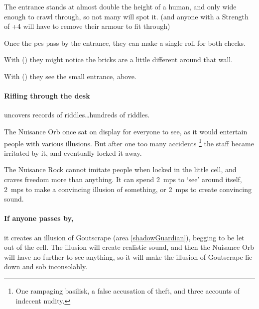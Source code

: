 The entrance stands at almost double the height of a human, and only wide enough to crawl through, so not many will spot it.
(and anyone with a Strength of +4 will have to remove their armour to fit through)

Once the \glspl{pc} pass by the entrance, they can make a single roll for both checks.

With  (\tn[14]) they might notice the bricks are a little different around that wall.

With  (\tn[12]) they see the small entrance, above.

\paragraph{Rifling through the desk}
uncovers records of riddles\ldots hundreds of riddles.


\begin{exampletext}
  The Nuisance Orb once sat on display for everyone to see, as it would entertain people with various illusions.
  But after one too many accidents%
  \footnote{One rampaging basilisk, a false accusation of theft, and three accounts of indecent nudity.}
  the staff became irritated by it, and eventually locked it away.
\end{exampletext}

\setcounter{wounds}{2}
  {
    \setcounter{Fire}{2}
    \setcounter{Air}{2}
    \setcounter{Academics}{2}
    \setcounter{Crafts}{1}
    \setcounter{Empathy}{2}
    \setcounter{Deceit}{2}
  }%

\showStdSpells[
  \setcounter{diceNo}{0}
]

The Nuisance Rock cannot imitate people when locked in the little cell, and craves freedom more than anything.
It can spend 2~\glspl{mp} to `see' around itself, 2~\glspl{mp} to make a convincing illusion of something, or 2~\glspl{mp} to create convincing sound.

\paragraph{If anyone passes by,}
it creates an illusion of Goutscrape (area \vref{shadowGuardian}), begging to be let out of the cell.
The illusion will create realistic sound, and then the Nuisance Orb will have no further  to see anything, so it will make the illusion of Goutscrape lie down and sob inconsolably.

